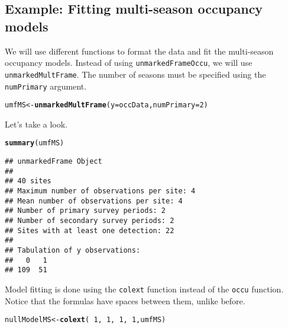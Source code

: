 \documentclass[12pt]{article}\usepackage[]{graphicx}\usepackage[]{xcolor}
\makeatletter
\newcommand{\hlnum}[1]{\textcolor[rgb]{0.686,0.059,0.569}{#1}}%
\newcommand{\hlopt}[1]{\textcolor[rgb]{0,0,0}{#1}}%
\newcommand{\hlstd}[1]{\textcolor[rgb]{0.345,0.345,0.345}{#1}}%
\newcommand{\hlkwb}[1]{\textcolor[rgb]{0.69,0.353,0.396}{#1}}%
\newcommand{\hlkwc}[1]{\textcolor[rgb]{0.333,0.667,0.333}{#1}}%
\newcommand{\hlkwd}[1]{\textcolor[rgb]{0.737,0.353,0.396}{\textbf{#1}}}%
\newenvironment{kframe}{%
 \def\at@end@of@kframe{}%
 \ifinner\ifhmode%
  \def\at@end@of@kframe{\end{minipage}}%
  \begin{minipage}{\columnwidth}%
 \fi\fi%
 \def\FrameCommand##1{\hskip\@totalleftmargin \hskip-\fboxsep
 \colorbox{shadecolor}{##1}\hskip-\fboxsep
     \hskip-\linewidth \hskip-\@totalleftmargin \hskip\columnwidth}%
 \MakeFramed {\advance\hsize-\width
   \@totalleftmargin\z@ \linewidth\hsize
   \@setminipage}}%
 {\par\unskip\endMakeFramed%
 \at@end@of@kframe}
\newenvironment{knitrout}{}{} %
\makeatother
\begin{document}
\subsection*{Example: Fitting multi-season occupancy models}


We will use different functions to format the data and fit the
multi-season occupancy models. Instead of using
\texttt{unmarkedFrameOccu}, we will use
\texttt{unmarkedMultFrame}. The number of seasons must be specified
using the \texttt{numPrimary} argument.


\begin{knitrout}
\color{fgcolor}\begin{kframe}
\begin{alltt}
\hlstd{umfMS} \hlkwb{<-} \hlkwd{unmarkedMultFrame}\hlstd{(}\hlkwc{y}\hlstd{=occData,} \hlkwc{numPrimary}\hlstd{=}\hlnum{2}\hlstd{)}
\end{alltt}
\end{kframe}
\end{knitrout}

Let's take a look.

\begin{knitrout}
\color{fgcolor}\begin{kframe}
\begin{alltt}
\hlkwd{summary}\hlstd{(umfMS)}
\end{alltt}
\begin{verbatim}
## unmarkedFrame Object
## 
## 40 sites
## Maximum number of observations per site: 4 
## Mean number of observations per site: 4 
## Number of primary survey periods: 2 
## Number of secondary survey periods: 2 
## Sites with at least one detection: 22 
## 
## Tabulation of y observations:
##   0   1 
## 109  51
\end{verbatim}
\end{kframe}
\end{knitrout}

Model fitting is done using the \texttt{colext} function instead of
the \texttt{occu} function. Notice that the formulas have spaces
between them, unlike before.


\begin{knitrout}
\color{fgcolor}\begin{kframe}
\begin{alltt}
\hlstd{nullModelMS} \hlkwb{<-} \hlkwd{colext}\hlstd{(}\hlopt{~}\hlnum{1}\hlstd{,} \hlopt{~}\hlnum{1}\hlstd{,} \hlopt{~}\hlnum{1}\hlstd{,} \hlopt{~}\hlnum{1}\hlstd{, umfMS)}
\end{alltt}
\end{kframe}
\end{knitrout}
\end{document}
